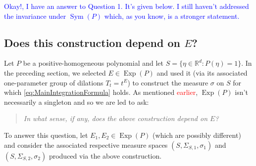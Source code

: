 \documentclass[11pt]{article}
\theoremstyle{theorem}
\newcommand\Sym{\operatorname{Sym}}
\newcommand\Exp{\operatorname{Exp}}
\begin{document}
\textcolor{blue}{{\Large Okay!}, I have an answer to Question 1. It's given below. I still haven't addressed the invariance under $\Sym(P)$ which, as you know, is a stronger statement. }
\subsection{Does this construction depend on $E$?}

Let $P$ be a positive-homogeneous polynomial and let $S=\{\eta\in\mathbb{R}^d:P(\eta)=1\}$. In the preceding section, we selected $E\in\Exp(P)$ and used it (via its associated one-parameter group of dilations $T_t=t^E$) to construct the measure $\sigma$ on $S$ for which \eqref{eq:MainIntegrationFormula} holds. As mentioned \textcolor{red}{earlier}, $\Exp(P)$ isn't necessarily a singleton and so we are led to ask: 
\begin{quote}\textit{In what sense, if any, does the above construction depend on $E$?} 
\end{quote}
To answer this question, let $E_1,E_2\in\Exp(P)$  (which are possibly different) and consider the associated respective measure spaces $(S,\Sigma_{S,1},\sigma_1)$ and $(S,\Sigma_{S,2},\sigma_2)$ produced via the above construction. 
\end{document}
